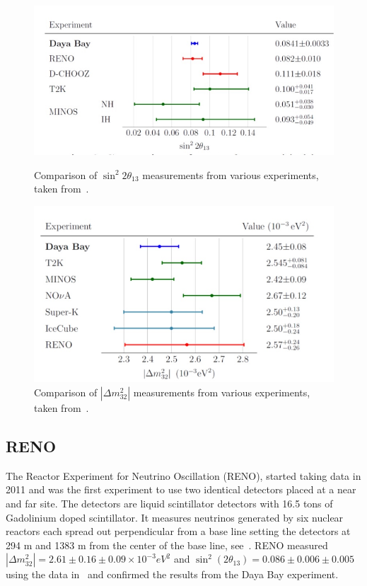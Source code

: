 \begin{figure}[h!]
  \centering
  \begin{minipage}[b]{0.49\textwidth}
    \includegraphics[width=\textwidth]{figures/db3.jpeg}
    \vspace{2mm}
    \caption{Comparison of $\sin^2 2\theta_{13}$ measurements from various experiments, taken from~\cite{74DayaBay}.}
    \label{fig:db3}
  \end{minipage}
  \hfill
  \begin{minipage}[b]{0.49\textwidth}
    \includegraphics[width=\textwidth]{figures/db4.jpeg}
       \vspace{2mm}
    \caption{Comparison of $|\Delta m^2_{32}|$ measurements from various experiments, taken from~\cite{74DayaBay}.}
     \label{fig:db4}
  \end{minipage}
\end{figure}

\subsection{RENO}
The Reactor Experiment for Neutrino Oscillation (RENO), started taking data in 2011 and was the first experiment to use two identical detectors placed at a near and far site. The detectors are liquid scintillator detectors with 16.5 tons of Gadolinium doped scintillator. It measures neutrinos generated by six nuclear reactors each spread out perpendicular from a base line setting the detectors at 294 m and 1383 m from the center of the base line, see~. RENO measured $|\Delta m^2_{32}| = 2.61 \pm 0.16 \pm 0.09 \times 10^{-3} eV^2$ and $\sin^2(2\theta_{13}) = 0.086 \pm 0.006 \pm 0.005$ using the data in~ and confirmed the results from the Daya Bay experiment.

